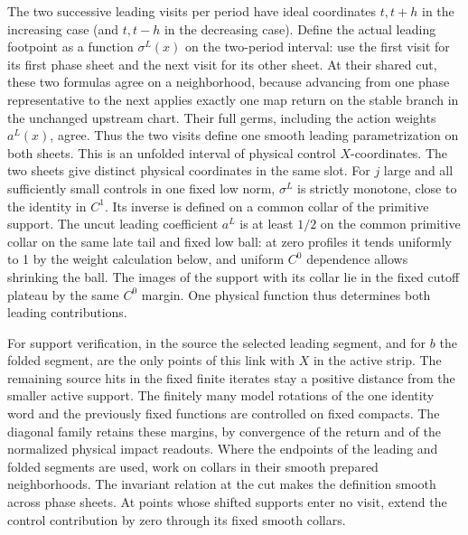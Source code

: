 \documentclass[11pt]{article}
\begin{document}
The two successive leading visits per period have ideal coordinates \(t,t+h\) in
the increasing case (and \(t,t-h\) in the decreasing case). Define the actual
leading footpoint as a function \(\sigma^L(x)\) on the two-period interval: use
the first visit for its first phase sheet and the next visit for its other
sheet. At their shared cut, these two formulas agree on a neighborhood, because
advancing from one phase representative to the next applies exactly one map
return on the stable branch in the unchanged upstream chart. Their full germs,
including the action weights \(a^L(x)\), agree. Thus the two visits define one
smooth leading parametrization on both sheets. This is an unfolded interval of
physical control \(X\)-coordinates. The two sheets give distinct physical
coordinates in the same slot. For \(j\) large and all sufficiently small
controls in one fixed low norm, \(\sigma^L\) is strictly monotone, close to the
identity in \(C^1\). Its inverse is defined on a common collar of the primitive
support. The uncut leading coefficient \(a^L\) is at least \(1/2\) on the common
primitive collar on the same late tail and fixed low ball: at zero profiles it
tends uniformly to 1 by the weight calculation below, and uniform \(C^0\)
dependence allows shrinking the ball. The images of the support with its collar
lie in the fixed cutoff plateau by the same \(C^0\) margin. One physical
function thus determines both leading contributions.

For support verification, in the source the selected leading segment, and for
\(b\) the folded segment, are the only points of this link with \(X\) in the
active strip. The remaining source hits in the fixed finite iterates stay a
positive distance from the smaller active support. The finitely many model
rotations of the one identity word and the previously fixed functions are
controlled on fixed compacts. The diagonal family retains these margins, by
convergence of the return and of the normalized physical impact readouts. Where
the endpoints of the leading and folded segments are used, work on collars in
their smooth prepared neighborhoods. The invariant relation at the cut makes the
definition smooth across phase sheets. At points whose shifted supports enter no
visit, extend the control contribution by zero through its fixed smooth collars.
\end{document}
